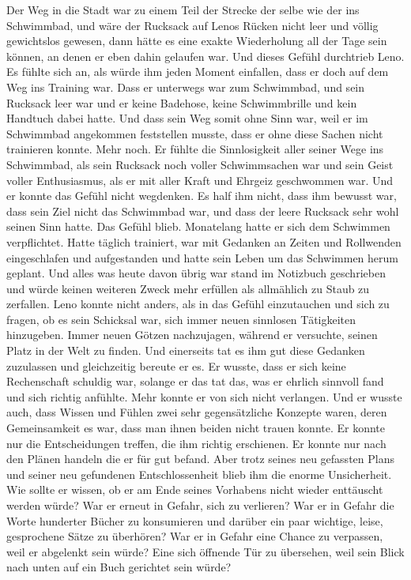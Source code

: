 \documentclass[ngerman,smalldemyvopaper,11pt,oneside,onecolumn,openright,extrafontsizes]{memoir}
\begin{document}
Der Weg in die Stadt war zu einem Teil der Strecke der selbe wie der ins Schwimmbad, und wäre der Rucksack auf Lenos Rücken nicht leer und völlig gewichtslos gewesen, dann hätte es eine exakte Wiederholung all der Tage sein können, an denen er eben dahin gelaufen war. Und dieses Gefühl durchtrieb Leno. Es fühlte sich an, als würde ihm jeden Moment einfallen, dass er doch auf dem Weg ins Training war. Dass er unterwegs war zum Schwimmbad, und sein Rucksack leer war und er keine Badehose, keine Schwimmbrille und kein Handtuch dabei hatte. Und dass sein Weg somit ohne Sinn war, weil er im Schwimmbad angekommen feststellen musste, dass er ohne diese Sachen nicht trainieren konnte. Mehr noch. Er fühlte die Sinnlosigkeit aller seiner Wege ins Schwimmbad, als sein Rucksack noch voller Schwimmsachen war und sein Geist voller Enthusiasmus, als er mit aller Kraft und Ehrgeiz geschwommen war. Und er konnte das Gefühl nicht wegdenken. Es half ihm nicht, dass ihm bewusst war, dass sein Ziel nicht das Schwimmbad war, und dass der leere Rucksack sehr wohl seinen Sinn hatte. Das Gefühl blieb. Monatelang hatte er sich dem Schwimmen verpflichtet. Hatte täglich trainiert, war mit Gedanken an Zeiten und Rollwenden eingeschlafen und aufgestanden und hatte sein Leben um das Schwimmen herum geplant. Und alles was heute davon übrig war stand im Notizbuch geschrieben und würde keinen weiteren Zweck mehr erfüllen als allmählich zu Staub zu zerfallen. Leno konnte nicht anders, als in das Gefühl einzutauchen und sich zu fragen, ob es sein Schicksal war, sich immer neuen sinnlosen Tätigkeiten hinzugeben. Immer neuen Götzen nachzujagen, während er versuchte, seinen Platz in der Welt zu finden. Und einerseits tat es ihm gut diese Gedanken zuzulassen und gleichzeitig bereute er es. Er wusste, dass er sich keine Rechenschaft schuldig war, solange er das tat das, was er ehrlich sinnvoll fand und sich richtig anfühlte. Mehr konnte er von sich nicht verlangen. Und er wusste auch, dass Wissen und Fühlen zwei sehr gegensätzliche Konzepte waren, deren Gemeinsamkeit es war, dass man ihnen beiden nicht trauen konnte. Er konnte nur die Entscheidungen treffen, die ihm richtig erschienen. Er konnte nur nach den Plänen handeln die er für gut befand. Aber trotz seines neu gefassten Plans und seiner neu gefundenen Entschlossenheit blieb ihm die enorme Unsicherheit. Wie sollte er wissen, ob er am Ende seines Vorhabens nicht wieder enttäuscht werden würde? War er erneut in Gefahr, sich zu verlieren? War er in Gefahr die Worte hunderter Bücher zu konsumieren und darüber ein paar wichtige, leise, gesprochene Sätze zu überhören? War er in Gefahr eine Chance zu verpassen, weil er abgelenkt sein würde? Eine sich öffnende Tür zu übersehen, weil sein Blick nach unten auf ein Buch gerichtet sein würde?\\
\end{document}
